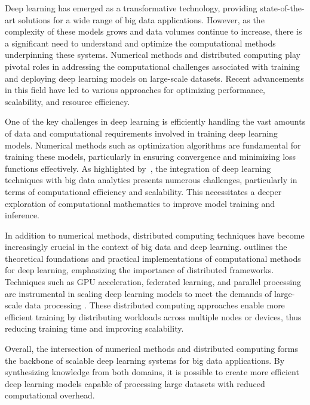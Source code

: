 

Deep learning has emerged as a transformative technology, providing state-of-the-art solutions for a wide range of big data applications.
However, as the complexity of these models grows and data volumes continue to increase, there is a significant need to understand and optimize the computational methods underpinning these systems.
 Numerical methods and distributed computing play pivotal roles in addressing the computational challenges associated with training and deploying deep learning models on large-scale datasets.
Recent advancements in this field have led to various approaches for optimizing performance, scalability, and resource efficiency.

One of the key challenges in deep learning is efficiently handling the vast amounts of data and computational requirements involved in training deep learning models.
Numerical methods such as optimization algorithms are fundamental for training these models, particularly in ensuring convergence and minimizing loss functions effectively.
 As highlighted by~\cite{najafabadi2015deep}, the integration of deep learning techniques with big data analytics presents numerous challenges, particularly in terms of computational efficiency and scalability. This necessitates a deeper exploration of computational mathematics to improve model training and inference.

In addition to numerical methods, distributed computing techniques have become increasingly crucial in the context of big data and deep learning.\cite{yan2023computational}
outlines the theoretical foundations and practical implementations of computational methods for deep learning, emphasizing the importance of distributed frameworks.
Techniques such as GPU acceleration, federated learning, and parallel processing are instrumental in scaling deep learning models to meet the demands of large-scale data processing \cite{dehghani2023distributed}.
These distributed computing approaches enable more efficient training by distributing workloads across multiple nodes or devices, thus reducing training time and improving scalability.

Overall, the intersection of numerical methods and distributed computing forms the backbone of scalable deep learning systems for big data applications.
By synthesizing knowledge from both domains, it is possible to create more efficient deep learning models capable of processing large datasets with reduced computational overhead.
